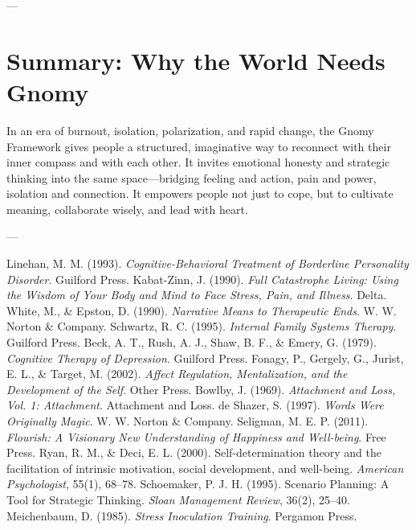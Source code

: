 \documentclass{article}
\begin{document}
---

\section{Summary: Why the World Needs Gnomy}
In an era of burnout, isolation, polarization, and rapid change, the Gnomy Framework gives people a structured, imaginative way to reconnect with their inner compass and with each other. It invites emotional honesty and strategic thinking into the same space—bridging feeling and action, pain and power, isolation and connection. It empowers people not just to cope, but to cultivate meaning, collaborate wisely, and lead with heart.

---

\begin{thebibliography}{99}
     Linehan, M. M. (1993). \textit{Cognitive-Behavioral Treatment of Borderline Personality Disorder}. Guilford Press.
     Kabat-Zinn, J. (1990). \textit{Full Catastrophe Living: Using the Wisdom of Your Body and Mind to Face Stress, Pain, and Illness}. Delta.
     White, M., \& Epston, D. (1990). \textit{Narrative Means to Therapeutic Ends}. W. W. Norton \& Company.
     Schwartz, R. C. (1995). \textit{Internal Family Systems Therapy}. Guilford Press.
     Beck, A. T., Rush, A. J., Shaw, B. F., \& Emery, G. (1979). \textit{Cognitive Therapy of Depression}. Guilford Press.
     Fonagy, P., Gergely, G., Jurist, E. L., \& Target, M. (2002). \textit{Affect Regulation, Mentalization, and the Development of the Self}. Other Press.
     Bowlby, J. (1969). \textit{Attachment and Loss, Vol. 1: Attachment}. Attachment and Loss.
     de Shazer, S. (1997). \textit{Words Were Originally Magic}. W. W. Norton \& Company.
     Seligman, M. E. P. (2011). \textit{Flourish: A Visionary New Understanding of Happiness and Well-being}. Free Press.
     Ryan, R. M., \& Deci, E. L. (2000). Self-determination theory and the facilitation of intrinsic motivation, social development, and well-being. \textit{American Psychologist}, 55(1), 68–78.
     Schoemaker, P. J. H. (1995). Scenario Planning: A Tool for Strategic Thinking. \textit{Sloan Management Review}, 36(2), 25–40.
     Meichenbaum, D. (1985). \textit{Stress Inoculation Training}. Pergamon Press.

\end{thebibliography}
\end{document}
